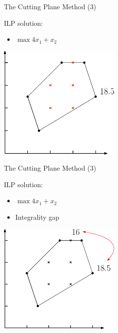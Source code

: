 \documentclass[10pt]{beamer}
\begin{document}
\begin{frame}[t]{The Cutting Plane Method (3)}
        \begin{minipage}[t]{0.48\textwidth}
            ILP solution:
            \begin{itemize}
                \item \alert{$ \max 4x_1 + x_2 $}
            \end{itemize}
        \end{minipage}
        \begin{minipage}[t]{0.48\textwidth}
            \begin{center}
                \includegraphics[width=6cm]{cutting_plane007.eps} 
            \end{center}
        \end{minipage}        
\end{frame}

\begin{frame}[t]{The Cutting Plane Method (3)}
        \begin{minipage}[t]{0.48\textwidth}
            ILP solution:
            \begin{itemize}
                \item \alert{$ \max 4x_1 + x_2 $}
                \item Integrality gap
            \end{itemize}
        \end{minipage}
        \begin{minipage}[t]{0.48\textwidth}
            \begin{center}
                \includegraphics[width=6cm]{cutting_plane008.eps} 
            \end{center}
        \end{minipage}        
\end{frame}
\end{document}

